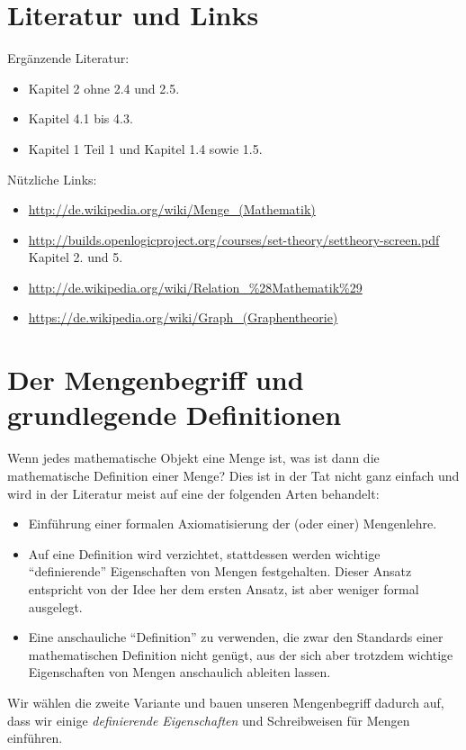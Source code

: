 \section*{Literatur und Links}
Ergänzende Literatur:
\begin{itemize}
\item \cite{diskreteStrukturen} Kapitel 2 ohne 2.4 und 2.5.
\item \cite{diskreteStrukturen} Kapitel 4.1 bis 4.3.
\item \cite{pareigis} Kapitel 1 Teil 1 und Kapitel 1.4 sowie 1.5.
\end{itemize}
Nützliche Links:
\begin{itemize}
\item \url{http://de.wikipedia.org/wiki/Menge_(Mathematik)}
\item \url{http://builds.openlogicproject.org/courses/set-theory/settheory-screen.pdf} Kapitel 2. und 5.
\item \url{http://de.wikipedia.org/wiki/Relation_%28Mathematik%29}
\item \url{https://de.wikipedia.org/wiki/Graph_(Graphentheorie)}
\end{itemize}


\section{Der Mengenbegriff und grundlegende Definitionen}

Wenn jedes mathematische Objekt eine Menge ist, was ist dann die mathematische Definition einer Menge? Dies ist in der Tat nicht ganz einfach und wird in der Literatur meist auf eine der folgenden Arten behandelt:
\begin{itemize}
\item Einführung einer formalen Axiomatisierung der (oder einer) Mengenlehre.
\item Auf eine Definition wird verzichtet, stattdessen werden wichtige ``definierende'' Eigenschaften von Mengen festgehalten. Dieser Ansatz entspricht von der Idee her dem ersten Ansatz, ist aber weniger formal ausgelegt.
\item Eine anschauliche ``Definition'' zu verwenden, die zwar den Standards einer mathematischen Definition nicht genügt, aus der sich aber trotzdem wichtige Eigenschaften von Mengen anschaulich ableiten lassen.
\end{itemize}
Wir wählen die zweite Variante und bauen unseren Mengenbegriff dadurch auf, dass wir einige \textit{definierende} \textit{Eigenschaften} und Schreibweisen für Mengen einführen.

